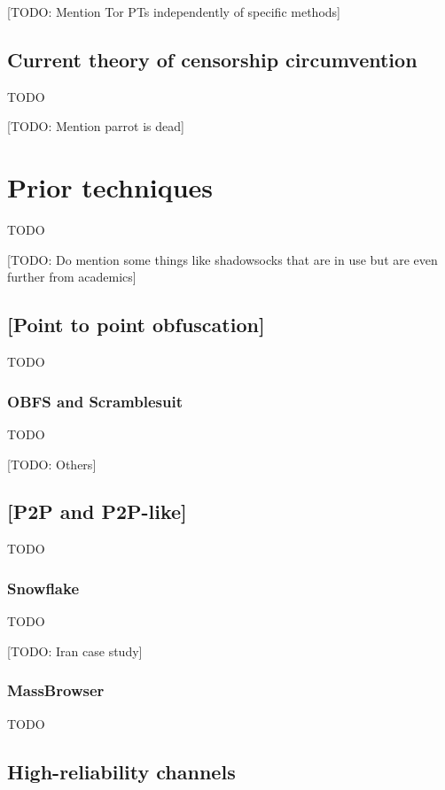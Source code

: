 \documentclass[12pt]{report}
\begin{document}
[TODO: Mention Tor PTs independently of specific methods]

\subsection{Current theory of censorship circumvention}

TODO

[TODO: Mention parrot is dead]

\section{Prior techniques}

TODO

[TODO: Do mention some things like shadowsocks that are in use but are even further from academics]

\subsection{[Point to point obfuscation]}

TODO

\subsubsection{OBFS and Scramblesuit}

TODO

[TODO: Others]

\subsection{[P2P and P2P-like]}

TODO

\subsubsection{Snowflake}

TODO

[TODO: Iran case study]

\subsubsection{MassBrowser}

TODO

\subsection{High-reliability channels}
\end{document}
